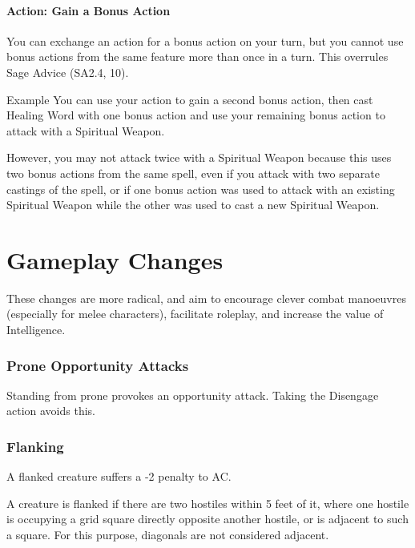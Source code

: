\documentclass[letterpaper,twocolumn,openany,nodeprecatedcode]{dndbook}
\begin{document}
\label{gameplay-bonus-action}
\subsubsection{Action: Gain a Bonus Action}
You can exchange an action for a bonus action on your turn, but you cannot use bonus actions from the same feature more than once in a turn. This overrules Sage Advice (SA2.4, 10).

\begin{DndComment}{Example}
You can use your action to gain a second bonus action, then cast Healing Word with one bonus action and use your remaining bonus action to attack with a Spiritual Weapon. 

However, you may not attack twice with a Spiritual Weapon because this uses two bonus actions from the same spell, even if you attack with two separate castings of the spell, or if one bonus action was used to attack with an existing Spiritual Weapon while the other was used to cast a new Spiritual Weapon.
\end{DndComment}








\chapter{Gameplay Changes}

These changes are more radical, and aim to encourage clever combat manoeuvres (especially for melee characters), facilitate roleplay, and increase the value of Intelligence.


\subsection{Prone Opportunity Attacks}
Standing from prone provokes an opportunity attack. Taking the Disengage action avoids this.

\subsection{Flanking}

A flanked creature suffers a -2 penalty to AC.

A creature is flanked if there are two hostiles within 5 feet of it, where one hostile is occupying a grid square directly opposite another hostile, or is adjacent to such a square. For this purpose, diagonals are not considered adjacent.
\end{document}
